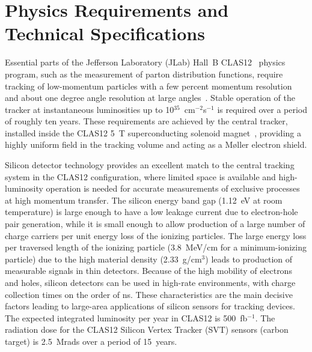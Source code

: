 \section{Physics Requirements and Technical Specifications}

Essential parts of the Jefferson Laboratory (JLab) Hall~B CLAS12~\cite{clas12-nim} physics program, such as
the measurement of parton distribution functions, require tracking of low-momentum  particles with a few percent
momentum resolution and about one degree angle resolution at large angles~\cite{Burkert:2018nvj}. Stable operation
of the tracker at instantaneous luminosities up to 10$^{35}$~cm$^{-2}$s$^{-1}$ is required over a period of roughly
ten years. These requirements are achieved by the central tracker, installed inside the CLAS12 5~T superconducting
solenoid magnet~\cite{magnets-nim}, providing a highly uniform field in the tracking volume and acting as a M{\o}ller
electron shield.

Silicon detector technology provides an excellent match to the central tracking system in the CLAS12 configuration,
where limited space is available and high-luminosity operation is needed for accurate measurements of exclusive
processes at high momentum transfer. The silicon energy band gap (1.12~eV at room temperature) is large enough to
have a low leakage current due to electron-hole pair generation, while it is small enough to allow production of a large
number of charge carriers per unit energy loss of the ionizing particles. The large energy loss per traversed length
of the ionizing particle (3.8~MeV/cm for a minimum-ionizing particle) due to the high material density
(2.33~g/cm$^3$) leads to production of  measurable signals in thin detectors. Because of the high mobility of
electrons and holes, silicon detectors can be used in high-rate environments, with charge collection times on the
order of ns. These characteristics are the main decisive factors leading to large-area applications of silicon sensors
for tracking devices. The expected integrated luminosity per year in CLAS12 is 500~fb$^{-1}$. The radiation dose
for the CLAS12 Silicon Vertex Tracker (SVT) sensors (carbon target) is 2.5~Mrads over a period of 15~years.

